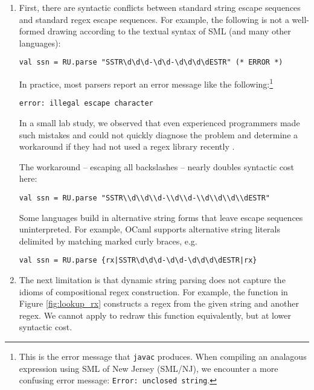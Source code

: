 \begin{enumerate} 
\item First, there are syntactic conflicts between standard string escape sequences and standard regex escape sequences. For example, the following is not a well-formed drawing according to the textual syntax of SML (and many other languages):
\begin{lstlisting}[numbers=none,mathescape=|]
val ssn = RU.parse "SSTR\d\d\d-\d\d-\d\d\d\dESTR" (* ERROR *)
\end{lstlisting}
In practice, most parsers report an error message like the following:\footnote{This is the error message that \texttt{javac} produces. When compiling an analagous expression using SML of New Jersey (SML/NJ), we encounter a more confusing error message: \texttt{Error: unclosed string}.}
\begin{lstlisting}[numbers=none]
error: illegal escape character
\end{lstlisting}
In a small lab study, we observed that even experienced programmers made such mistakes and could not quickly diagnose the problem and determine a workaround if they had not used a regex library recently  \cite{Omar:2012:ACC:2337223.2337324}.

The workaround -- escaping all backslashes -- nearly doubles syntactic cost here:
\begin{lstlisting}[numbers=none]
val ssn = RU.parse "SSTR\\d\\d\\d-\\d\\d-\\d\\d\\d\\dESTR"
\end{lstlisting}

Some languages build in alternative string forms that leave escape sequences uninterpreted. For example, OCaml supports alternative string literals delimited by matching marked curly braces, e.g. 
\begin{lstlisting}[numbers=none]
val ssn = RU.parse {rx|SSTR\d\d\d-\d\d-\d\d\d\dESTR|rx}
\end{lstlisting}
\item The next limitation is that dynamic string parsing does not capture  the idioms of compositional regex construction. 
For example, the function  in Figure \ref{fig:lookup_rx} constructs a regex from the given string and another regex. We cannot apply  to redraw this function equivalently, but at lower syntactic cost. 


\end{enumerate}
